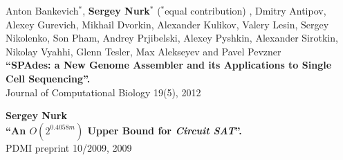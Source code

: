 \begin{outerlist}
\item Anton Bankevich$^*$, \textbf{Sergey Nurk}$^*$ ($^*$equal contribution)%
, Dmitry Antipov, Alexey Gurevich, Mikhail Dvorkin, Alexander Kulikov, Valery Lesin, Sergey Nikolenko, Son Pham, Andrey Prjibelski, Alexey Pyshkin, Alexander Sirotkin, Nikolay Vyahhi, Glenn Tesler, Max Alekseyev and Pavel Pevzner \\
\textbf{``SPAdes: a New Genome Assembler and its Applications to Single Cell Sequencing''.}\\
Journal of Computational Biology 19(5), 2012

\item \textbf{Sergey Nurk} \\
\textbf{``An $O(2^{0.4058m})$ Upper Bound for \textit{Circuit SAT}''.}\\
PDMI preprint 10/2009, 2009


\end{outerlist}

